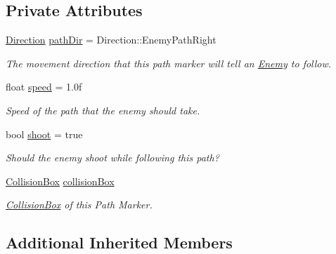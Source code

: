\subsection*{Private Attributes}
\begin{DoxyCompactItemize}
\item 
\mbox{\label{class_path_marker_a29ac6fbdb0aa057784a2044bb0cc4938}} 
\mbox{\hyperlink{class_path_marker_a5cc5188373e0b67016a99d3ded49f301}{Direction}} \mbox{\hyperlink{class_path_marker_a29ac6fbdb0aa057784a2044bb0cc4938}{path\+Dir}} = Direction\+::\+Enemy\+Path\+Right
\begin{DoxyCompactList}\small\item\em The movement direction that this path marker will tell an \mbox{\hyperlink{class_enemy}{Enemy}} to follow. \end{DoxyCompactList}\item 
\mbox{\label{class_path_marker_a880e8f7c34c884e7cc5d22d0c4509c08}} 
float \mbox{\hyperlink{class_path_marker_a880e8f7c34c884e7cc5d22d0c4509c08}{speed}} = 1.\+0f
\begin{DoxyCompactList}\small\item\em Speed of the path that the enemy should take. \end{DoxyCompactList}\item 
\mbox{\label{class_path_marker_a6ef43d1623c24b4c1b677b871286dc15}} 
bool \mbox{\hyperlink{class_path_marker_a6ef43d1623c24b4c1b677b871286dc15}{shoot}} = true
\begin{DoxyCompactList}\small\item\em Should the enemy shoot while following this path? \end{DoxyCompactList}\item 
\mbox{\label{class_path_marker_a9f6ceebf8abef17aab6cad8c717cfd25}} 
\mbox{\hyperlink{class_collision_box}{Collision\+Box}} \mbox{\hyperlink{class_path_marker_a9f6ceebf8abef17aab6cad8c717cfd25}{collision\+Box}}
\begin{DoxyCompactList}\small\item\em \mbox{\hyperlink{class_collision_box}{Collision\+Box}} of this Path Marker. \end{DoxyCompactList}\end{DoxyCompactItemize}
\subsection*{Additional Inherited Members}


